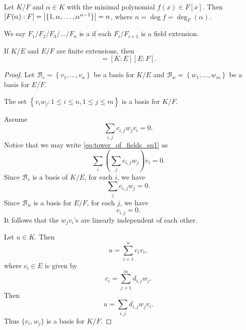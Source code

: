 \documentclass[notoc,notitlepage,nobib]{tufte-book}
\begin{document}
\begin{eg}
  Let $K / F$ and $\alpha \in K$ with the minimal polynomial $f(x) \in F[x]$.
  Then $[ F(\alpha) : F ] = \left| \{ 1, \alpha, \ldots, \alpha^{n - 1} \} \right| = n$,
  where $n = \deg f = \deg_F(\alpha)$.
\end{eg}

\begin{defn}\label{defn:tower_of_fields}
  We say $F_1 / F_2 / F_3 / \hdots / F_n$ is a  if each $F_i / F_{i + 1}$
  is a field extension.
\end{defn}

\begin{thm}\label{thm:tower_theorem}
  If $K / E$ and $E / F$ are finite extensions, then
  \begin{equation*}
    [K : F] = [K : E] [E : F].
  \end{equation*}
\end{thm}

\begin{proof}
  Let $\mathcal{B}_v = \left\{ v_1, \ldots, v_n \right\}$ be a basis for $K / E$ and
  $\mathcal{B}_w = \left\{ w_1, \ldots, w_m \right\}$ be a basis for $E / F$.

  \noindent
   The set $\left\{ v_i w_j : 1 \leq i \leq n, 1 \leq j \leq m \right\}$
  is a basis for $K / F$.

  \noindent
   Assume
  \begin{equation}\label{eq:tower_of_fields_eq1}
    \sum_{i, j} c_{i, j} w_j v_i = 0.
  \end{equation}
  Notice that we may write \cref{eq:tower_of_fields_eq1} as
  \begin{equation*}
    \sum_{i} \left( \sum_{j} c_{i, j} w_j \right) v_i = 0.
  \end{equation*}
  Since $\mathcal{B}_v$ is a basis of $K / E$, for each $i$, we have
  \begin{equation*}
    \sum_{j} c_{i, j} w_j = 0.
  \end{equation*}
  Since $\mathcal{B}_w$ is a basis for $E / F$, for each $j$, we have
  \begin{equation*}
    c_{i, j} = 0.
  \end{equation*}
  It follows that the $w_j v_i$'s are linearly independent of each other.

  \noindent
   Let $u \in K$. Then
  \begin{equation*}
    u = \sum_{i=1}^{n} c_i v_i,
  \end{equation*}
  where $c_i \in E$ is given by
  \begin{equation*}
    c_i = \sum_{j=1}^{m} d_{i, j} w_j.
  \end{equation*}
  Then
  \begin{equation*}
    u = \sum_{i, j} d_{i, j} w_j v_i.
  \end{equation*}
  Thus $\{ v_i, w_j \}$ is a basis for $K / F$.
\end{proof}
\end{document}
